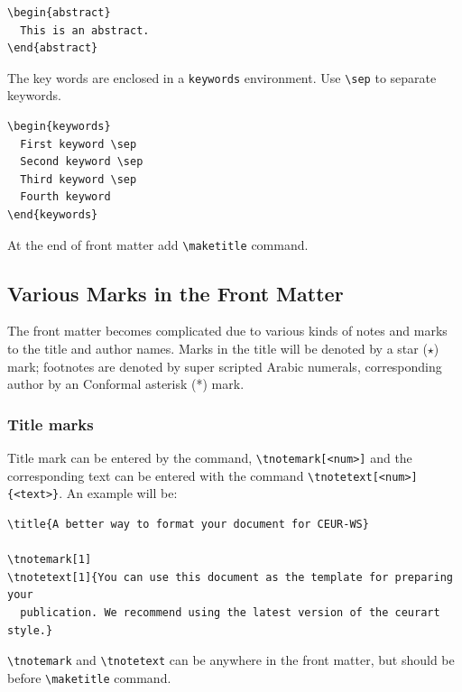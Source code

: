 \documentclass[
]{ceurart}
\begin{document}
\begin{lstlisting}
\begin{abstract}
  This is an abstract.
\end{abstract}
\end{lstlisting}

The key words are enclosed in a \verb|keywords|
environment. Use \verb|\sep| to separate keywords.

\begin{lstlisting}
\begin{keywords}
  First keyword \sep 
  Second keyword \sep 
  Third keyword \sep 
  Fourth keyword
\end{keywords}
\end{lstlisting}

At the end of front matter add \verb|\maketitle| command.

\subsection{Various Marks in the Front Matter}

The front matter becomes complicated due to various kinds
of notes and marks to the title and author names. Marks in
the title will be denoted by a star ($\star$) mark;
footnotes are denoted by super scripted Arabic numerals,
corresponding author by an Conformal asterisk (*) mark.

\subsubsection{Title marks}

Title mark can be entered by the command, \verb|\tnotemark[<num>]|
and the corresponding text can be entered with the command
\verb|\tnotetext[<num>]{<text>}|. An example will be:

\begin{lstlisting}
\title{A better way to format your document for CEUR-WS}

\tnotemark[1]
\tnotetext[1]{You can use this document as the template for preparing your
  publication. We recommend using the latest version of the ceurart style.}
\end{lstlisting}

\verb|\tnotemark| and \verb|\tnotetext| can be anywhere in
the front matter, but should be before \verb|\maketitle| command.
\end{document}
